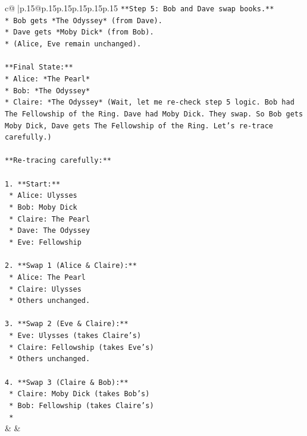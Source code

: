 \documentclass{article}
\begin{document}
{\begin{supertabular}{c@{$\;$}|p{.15\linewidth}@{}p{.15\linewidth}p{.15\linewidth}p{.15\linewidth}p{.15\linewidth}p{.15\linewidth}}
{{{\texttt{**Step 5: Bob and Dave swap books.**} \\
\texttt{*   Bob gets *The Odyssey* (from Dave).} \\
\texttt{*   Dave gets *Moby Dick* (from Bob).} \\
\texttt{*   (Alice, Eve remain unchanged).} \\
\\ 
\texttt{**Final State:**} \\
\texttt{*   Alice: *The Pearl*} \\
\texttt{*   Bob: *The Odyssey*} \\
\texttt{*   Claire: *The Odyssey* (Wait, let me re{-}check step 5 logic. Bob had The Fellowship of the Ring. Dave had Moby Dick. They swap. So Bob gets Moby Dick, Dave gets The Fellowship of the Ring. Let's re{-}trace carefully.)} \\
\\ 
\texttt{**Re{-}tracing carefully:**} \\
\\ 
\texttt{1.  **Start:**} \\
\texttt{    *   Alice: Ulysses} \\
\texttt{    *   Bob: Moby Dick} \\
\texttt{    *   Claire: The Pearl} \\
\texttt{    *   Dave: The Odyssey} \\
\texttt{    *   Eve: Fellowship} \\
\\ 
\texttt{2.  **Swap 1 (Alice \& Claire):**} \\
\texttt{    *   Alice: The Pearl} \\
\texttt{    *   Claire: Ulysses} \\
\texttt{    *   Others unchanged.} \\
\\ 
\texttt{3.  **Swap 2 (Eve \& Claire):**} \\
\texttt{    *   Eve: Ulysses (takes Claire's)} \\
\texttt{    *   Claire: Fellowship (takes Eve's)} \\
\texttt{    *   Others unchanged.} \\
\\ 
\texttt{4.  **Swap 3 (Claire \& Bob):**} \\
\texttt{    *   Claire: Moby Dick (takes Bob's)} \\
\texttt{    *   Bob: Fellowship (takes Claire's)} \\
\texttt{    *} \\
            }
        }
    }
    & & \\ \\


\end{supertabular}}
\end{document}
